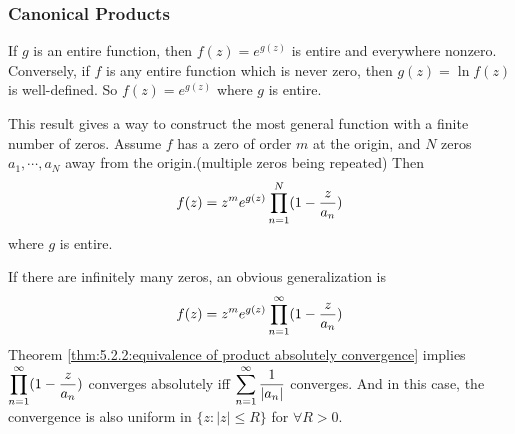 
\subsubsection{Canonical Products}
If  $ g  $ is an entire function, then  $ f(z)=e^{g(z)} $ is entire and everywhere nonzero. Conversely, if  $ f  $ is any entire function which is never zero, then  $ g(z)=\ln f(z)  $ is well-defined. So  $ f(z)=e^{g(z)} $ where  $ g  $ is entire. 

This result gives a way to construct the most general function with a finite number of zeros. Assume  $ f  $ has a zero of order  $ m  $ at the origin, and  $ N  $ zeros  $ a_1,\cdots,a_N $ away from the origin.(multiple zeros being repeated) Then 
\begin{equation}
    f(z)=z^me^{g(z)}\prod_{n=1}^N(1-\displaystyle\frac{z}{a_n})\label{eq:5.2.3:function with finite zeros}
\end{equation}
where  $ g  $ is entire.

If there are infinitely many zeros, an obvious generalization is 
\begin{equation}
    f(z)=z^me^{g(z)}\prod_{n=1}^\infty(1-\displaystyle\frac{z}{a_n})\label{eq:5.2.4:function with infinite zeros}
\end{equation}
Theorem \ref{thm:5.2.2:equivalence of product absolutely convergence} implies  $ \displaystyle\prod_{n=1}^\infty (1-\frac{z}{a_n}) $ converges absolutely iff  $ \displaystyle\sum_{n=1}^\infty\frac{1}{|a_n|} $ converges. And in this   case, the convergence is also uniform in  $ \{z:|z| \leq R\} $ for  $ \forall R>0 $.

